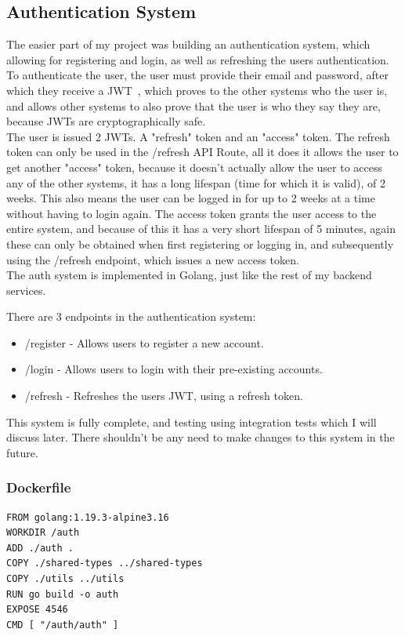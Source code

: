 \documentclass[titlepage]{article}
\begin{document}
\subsection{Authentication System}
The easier part of my project was building an authentication system, which allowing for registering and login, as well as refreshing the users authentication. To authenticate the user, the user must provide their email and password, after which they receive a JWT~\cite{jwt}, which proves to the other systems who the user is, and allows other systems to also prove that the user is who they say they are, because JWTs are cryptographically safe. \\

The user is issued 2 JWTs. A "refresh" token and an "access" token. The refresh token can only be used in the /refresh API Route, all it does it allows the user to get another "access" token, because it doesn't actually allow the user to access any of the other systems, it has a long lifespan (time for which it is valid), of 2 weeks. This also means the user can be logged in for up to 2 weeks at a time without having to login again. The access token grants the user access to the entire system, and because of this it has a very short lifespan of 5 minutes, again these can only be obtained when first registering or logging in, and subsequently using the /refresh endpoint, which issues a new access token. \\

The auth system is implemented in Golang, just like the rest of my backend services.

There are 3 endpoints in the authentication system:
\begin{itemize}
  \item /register - Allows users to register a new account.
  \item /login - Allows users to login with their pre-existing accounts.
  \item /refresh - Refreshes the users JWT, using a refresh token.
\end{itemize}

This system is fully complete, and testing using integration tests which I will discuss later. There shouldn't be any need to make changes to this system in the future.

\subsubsection{Dockerfile}
\begin{verbatim}
FROM golang:1.19.3-alpine3.16
WORKDIR /auth
ADD ./auth .
COPY ./shared-types ../shared-types
COPY ./utils ../utils
RUN go build -o auth
EXPOSE 4546
CMD [ "/auth/auth" ]
\end{verbatim}
\end{document}
